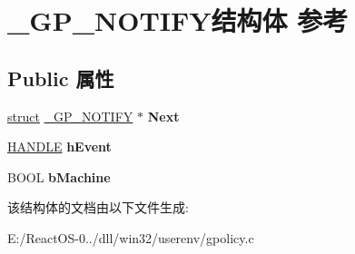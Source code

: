 \hypertarget{struct___g_p___n_o_t_i_f_y}{}\section{\+\_\+\+G\+P\+\_\+\+N\+O\+T\+I\+F\+Y结构体 参考}
\label{struct___g_p___n_o_t_i_f_y}
\subsection*{Public 属性}
\begin{DoxyCompactItemize}
\item 
\mbox{\label{struct___g_p___n_o_t_i_f_y_aa71554a4640758ceb2ab019a1e4ea0be}} 
\hyperlink{interfacestruct}{struct} \hyperlink{struct___g_p___n_o_t_i_f_y}{\+\_\+\+G\+P\+\_\+\+N\+O\+T\+I\+FY} $\ast$ {\bfseries Next}
\item 
\mbox{\label{struct___g_p___n_o_t_i_f_y_a5555819df99e097ca60f8111148fca6f}} 
\hyperlink{interfacevoid}{H\+A\+N\+D\+LE} {\bfseries h\+Event}
\item 
\mbox{\label{struct___g_p___n_o_t_i_f_y_ae84dfe5420a406cea575056a3b63fd7d}} 
B\+O\+OL {\bfseries b\+Machine}
\end{DoxyCompactItemize}


该结构体的文档由以下文件生成\+:\begin{DoxyCompactItemize}
\item 
E\+:/\+React\+O\+S-\/0../dll/win32/userenv/gpolicy.\+c\end{DoxyCompactItemize}
